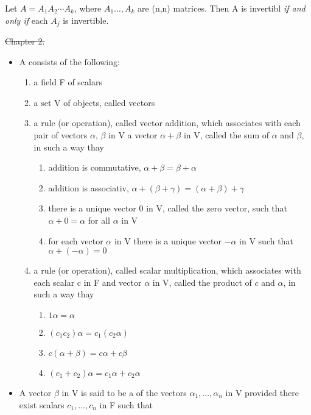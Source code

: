 \documentclass[12pt, a4paper]{article}
\begin{document}
\begin{CJK*}{UTF8}{bsmi}
\begin{enumerate}
     Let \(A = A_1A_2\cdots A_k\), where \(A_1\ldots,A_k\) are (n,n) matrices. Then A is invertibl \emph{if and only if } each \(A_j\) is invertible.
\end{enumerate}
\st{Chapter 2.}
\begin{itemize}
    \item A  consists of the following:\begin{enumerate}
        \item a field F of scalars
        \item a set V of objects, called vectors
        \item a rule (or operation), called vector addition, which associates with each pair of vectors \(\alpha,\, \beta\) in V a vector \(\alpha+\beta\) in V, called the sum of \(\alpha\) and \(\beta\), in such a way thay\begin{enumerate}
            \item addition is commutative, \(\alpha+\beta = \beta+\alpha\)
            \item addition is associativ, \(\alpha+ (\beta+\gamma) = (\alpha+\beta)+\gamma \) 
            \item there is a unique vector 0 in V, called the zero vector, such that \(\alpha+0=\alpha\) for all \(\alpha\) in V
            \item for each vector \(\alpha\) in V there is a unique vector \(-\alpha\) in V such that \(\alpha +(-\alpha)=0\)
        \end{enumerate}
        \item a rule (or operation), called scalar multiplication, which associates with each scalar c in F and vector \(\alpha\) in V, called the product of \(c\) and \(\alpha\), in such a way thay\begin{enumerate}
            \item \(1\alpha = \alpha\)
            \item \((c_1c_2)\alpha=c_1(c_2\alpha)\)
            \item \(c(\alpha+\beta)=c\alpha+c\beta\)
            \item \((c_1+c_2)\alpha = c_1\alpha+c_2\alpha\)
        \end{enumerate}
    \end{enumerate}
    \item A vector \(\beta\) in V is said to be a  of the vectors \(\alpha_1,\ldots,\alpha_n\) in V provided there exist scalars \(c_1,\ldots,c_n\) in F such that \begin{equation}

\end{equation}
\end{itemize}
\end{CJK*}
\end{document}
